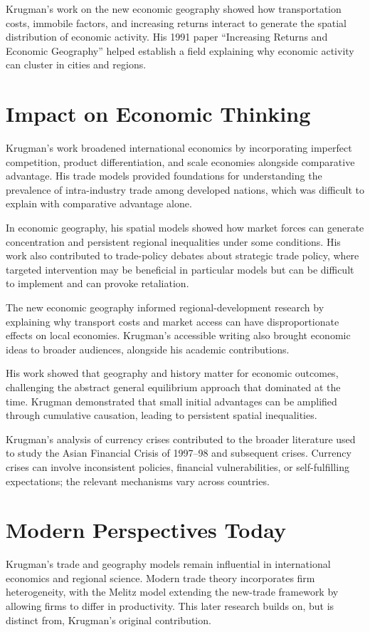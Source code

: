 Krugman's work on the new economic geography showed how transportation costs,
immobile factors, and increasing returns interact to generate the spatial
distribution of economic activity. His 1991 paper ``Increasing Returns and
Economic Geography'' helped establish a field explaining why economic activity
can cluster in cities and regions.

\section{Impact on Economic Thinking}
Krugman's work broadened international economics by incorporating imperfect
competition, product differentiation, and scale economies alongside comparative
advantage. His trade models provided foundations for understanding the prevalence
of intra-industry trade among developed nations, which was difficult to explain
with comparative advantage alone.

In economic geography, his spatial models showed how market forces can generate
concentration and persistent regional inequalities under some conditions. His
work also contributed to trade-policy debates about strategic trade policy,
where targeted intervention may be beneficial in particular models but can be
difficult to implement and can provoke retaliation.

The new economic geography informed regional-development research by explaining
why transport costs and market access can have disproportionate effects on local
economies. Krugman's accessible writing also brought economic ideas to broader
audiences, alongside his academic contributions.

His work showed that geography and history matter for economic outcomes,
challenging the abstract general equilibrium approach that dominated at the
time. Krugman demonstrated that small initial advantages can be amplified through
cumulative causation, leading to persistent spatial inequalities.

Krugman's analysis of currency crises contributed to the broader literature used
to study the Asian Financial Crisis of 1997--98 and subsequent crises. Currency
crises can involve inconsistent policies, financial vulnerabilities, or
self-fulfilling expectations; the relevant mechanisms vary across countries.

\section{Modern Perspectives Today}
Krugman's trade and geography models remain influential in international
economics and regional science. Modern trade theory incorporates firm
heterogeneity, with the Melitz model extending the new-trade framework by allowing
firms to differ in productivity. This later research builds on, but is distinct
from, Krugman's original contribution.

